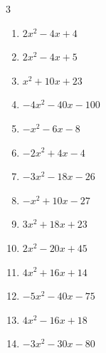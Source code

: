 \begin{multicols}{3}
\begin{enumerate}
  \item $2x^{2}-4x+4$


  \item $2x^{2}-4x+5$


  \item $x^{2}+10x+23$


  \item $-4x^{2}-40x-100$


  \item $-x^{2}-6x-8$


  \item $-2x^{2}+4x-4$


\columnbreak %

  \item $-3x^{2}-18x-26$


  \item $-x^{2}+10x-27$


  \item $3x^{2}+18x+23$


  \item $2x^{2}-20x+45$


  \item $4x^{2}+16x+14$


  \item $-5x^{2}-40x-75$


  \item $4x^{2}-16x+18$


  \item $-3x^{2}-30x-80$


\end{enumerate}
\end{multicols}
